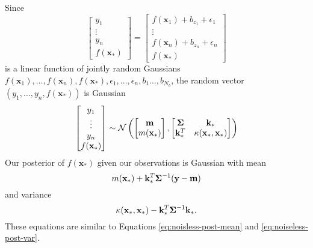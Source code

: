 Since
\begin{equation*}
    \begin{bmatrix}
        y_1 \\
        \vdots \\
        y_n \\
        f(\mathbf{x}_*)
    \end{bmatrix}
    =
    \begin{bmatrix}
        f(\mathbf{x}_1) + b_{z_1} + \epsilon_1 \\
        \vdots \\
        f(\mathbf{x}_n) + b_{z_n} + \epsilon_n \\
        f(\mathbf{x}_*)
    \end{bmatrix}
\end{equation*}
is a linear function of jointly random Gaussians $f(\mathbf{x}_1), \ldots, f(\mathbf{x}_n), f(\mathbf{x}_*), \epsilon_1, \ldots, \epsilon_n, b_1 \ldots, b_{N_b}$,
the random vector $(y_1, \ldots, y_n, f(\mathbf{x}_*))$ is Gaussian
\begin{equation*}
    \begin{bmatrix}
        y_1 \\
        \vdots \\
        y_n \\
        f(\mathbf{x}_*)
    \end{bmatrix}
    \sim
    \mathcal{N}\left(
    \begin{bmatrix}
            \mathbf{m} \\
            m(\mathbf{x}_*)
        \end{bmatrix}
    ,
    \begin{bmatrix}
            \boldsymbol{\Sigma} & \mathbf{k}_* \\
            \mathbf{k}_*^T & \kappa(\mathbf{x}_*, \mathbf{x}_*)
        \end{bmatrix}
    \right)
\end{equation*}
Our posterior of $f(\mathbf{x}_*)$ given our observations is Gaussian with mean
\begin{equation*}
    m(\mathbf{x}_*) + \mathbf{k}_*^T \boldsymbol{\Sigma}^{-1} (\mathbf{y} - \mathbf{m})
\end{equation*}
and variance
\begin{equation*}
    \kappa(\mathbf{x}_*, \mathbf{x}_*) - \mathbf{k}_*^T \boldsymbol{\Sigma}^{-1} \mathbf{k}_*.
\end{equation*}
These equations are similar to Equations \ref{eq:noisless-post-mean} and \ref{eq:noiseless-post-var}.

